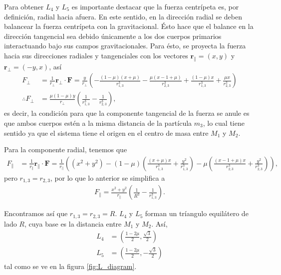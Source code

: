 Para obtener $L_4$ y $L_5$ es importante destacar que la fuerza centrípeta es, por definición, radial hacia afuera. En este sentido, en la dirección radial se deben balancear la fuerza centrípeta con la gravitacional. Ésto hace que el balance en la dirección tangencial sea debido únicamente a los dos cuerpos primarios interactuando bajo sus campos gravitacionales. Para ésto, se proyecta la fuerza hacia sus direcciones radiales y tangenciales con los vectores $\mathbf{r}_{\parallel} = (x,y)$ y $\mathbf{r}_{\bot} = (-y,x)$, así
\begin{align*}
 F_{\bot} &= \frac{1}{r_{\bot}} \mathbf{r}_{\bot} \cdot \mathbf{F} = \frac{y}{r_{\bot}} \left( - \frac{(1-\mu)(x + \mu)}{ r_{1,3}^3 } - \frac{\mu(x - 1 +\mu )}{ r_{2,3}^3 } + \frac{(1-\mu)x}{ r_{1,3}^3 } + \frac{\mu x}{ r_{2,3}^3 } \right) \\
 \therefore F_{\bot} &= \frac{ \mu(1-\mu) y}{r_{\bot}} \left( \frac{1}{r_{1,3}^3} - \frac{1}{r_{2,3}^3} \right),
\end{align*}
es decir, la condición para que la componente tangencial de la fuerza se anule es que ambos cuerpos estén a la misma distancia de la partícula $m_3$, lo cual tiene sentido ya que el sistema tiene el origen en el centro de masa entre $M_1$ y $M_2$. 

Para la componente radial, tenemos que
\begin{align*}
 F_{\parallel} &= \frac{1}{r_{\parallel}} \mathbf{r}_{\parallel} \cdot \mathbf{F} = \frac{1}{r_\parallel} \left( (x^2 + y^2) -  (1-\mu) \left( \frac{(x+ \mu)x}{r_{1,3}^3} + \frac{y^2}{r_{1,3}^3} \right) - \mu \left( \frac{(x - 1 +\mu) x}{r_{2,3}^3} + \frac{y^2}{r_{2,3}^3} \right) \right),
\end{align*}
pero $r_{1,3} = r_{2,3}$, por lo que lo anterior se simplifica a 
\begin{align*}
 F_{\parallel} = \frac{x^2 + y^2}{r_\parallel} \left( \frac{1}{R^3} - \frac{1}{r_{1,3}^3} \right).
\end{align*}

Encontramos así que $r_{1,3} = r_{2,3} = R$. $L_4$ y $L_5$ forman un tríangulo equilátero de lado $R$, cuya base es la distancia entre $M_1$ y $M_2$. Así,
\begin{align}
 L_4 &= \left( \frac{1 - 2\mu}{2}, \frac{\sqrt{3}}{2} \right) \\
 L_5 &= \left( \frac{1 - 2\mu}{2} , -\frac{\sqrt{3}}{2} \right)
 \label{eq:L4_L5}
\end{align} 
tal como se ve en la figura \ref{fig:L_diagram}.

